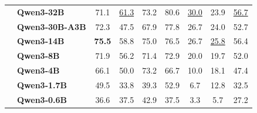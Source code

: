 \begin{table}[tbp]
{\begin{tabular}{clccccccc}
 & \textbf{Qwen3-32B} & 71.1 & \underline{61.3} & 73.2 & 80.6 & \underline{30.0} & 23.9 & \underline{56.7} \\
 & \textbf{Qwen3-30B-A3B} & 72.3 & 47.5 & 67.9 & 77.8 & 26.7 & 24.0 & 52.7 \\
 & \textbf{Qwen3-14B} & \textbf{75.5} & 58.8 & 75.0 & 76.5 & 26.7 & \underline{25.8} & 56.4 \\
 & \textbf{Qwen3-8B} & 71.9 & 56.2 & 71.4 & 72.9 & 20.0 & 19.7 & 52.0 \\
 & \textbf{Qwen3-4B} & 66.1 & 50.0 & 73.2 & 66.7 & 10.0 & 18.1 & 47.4 \\
 & \textbf{Qwen3-1.7B} & 49.5 & 33.8 & 39.3 & 52.9 & 6.7 & 12.8 & 32.5 \\
 & \textbf{Qwen3-0.6B} & 36.6 & 37.5 & 42.9 & 37.5 & 3.3 & 5.7 & 27.2 \\
\bottomrule
\end{tabular}
}
\end{table}

